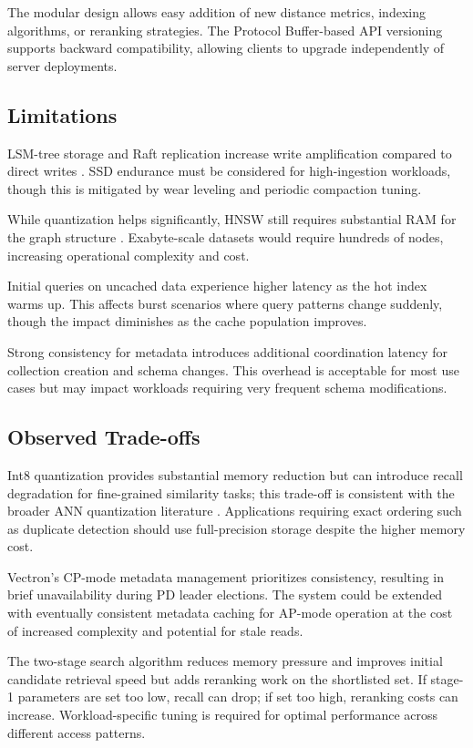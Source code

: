 \documentclass[conference]{IEEEtran}
\begin{document}
The modular design allows easy addition of new distance metrics, indexing algorithms, or reranking strategies. The Protocol Buffer-based API versioning supports backward compatibility, allowing clients to upgrade independently of server deployments.

\subsection{Limitations}

LSM-tree storage and Raft replication increase write amplification compared to direct writes \cite{lsm,raft}. SSD endurance must be considered for high-ingestion workloads, though this is mitigated by wear leveling and periodic compaction tuning.

While quantization helps significantly, HNSW still requires substantial RAM for the graph structure \cite{hnsw,pq}. Exabyte-scale datasets would require hundreds of nodes, increasing operational complexity and cost.

Initial queries on uncached data experience higher latency as the hot index warms up. This affects burst scenarios where query patterns change suddenly, though the impact diminishes as the cache population improves.

Strong consistency for metadata introduces additional coordination latency for collection creation and schema changes. This overhead is acceptable for most use cases but may impact workloads requiring very frequent schema modifications.

\subsection{Observed Trade-offs}

Int8 quantization provides substantial memory reduction but can introduce recall degradation for fine-grained similarity tasks; this trade-off is consistent with the broader ANN quantization literature \cite{pq,gpuann}. Applications requiring exact ordering such as duplicate detection should use full-precision storage despite the higher memory cost.

Vectron's CP-mode metadata management prioritizes consistency, resulting in brief unavailability during PD leader elections. The system could be extended with eventually consistent metadata caching for AP-mode operation at the cost of increased complexity and potential for stale reads.

The two-stage search algorithm reduces memory pressure and improves initial candidate retrieval speed but adds reranking work on the shortlisted set. If stage-1 parameters are set too low, recall can drop; if set too high, reranking costs can increase. Workload-specific tuning is required for optimal performance across different access patterns.
\end{document}
